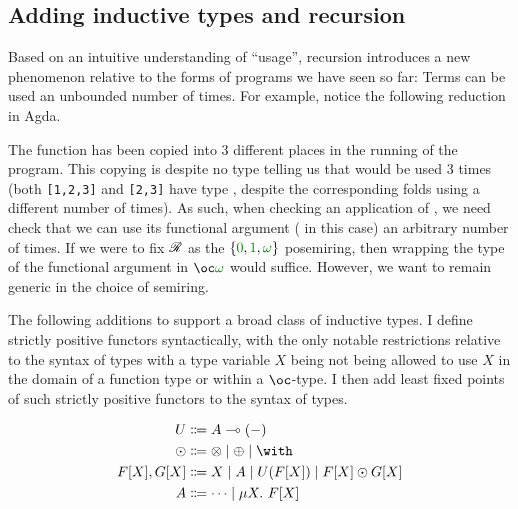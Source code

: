 \begin{mathpar}
\end{mathpar}

\subsection{Adding inductive types and recursion}\label{sec:rec}

Based on an intuitive understanding of ``usage'', recursion introduces a new
phenomenon relative to the forms of programs we have seen so far:
Terms can be used an unbounded number of times.
For example, notice the following reduction in Agda.


The function \AgdaFunction{\_+\_} has been copied into 3 different places in
the running of the program.
This copying is despite no type telling us that \AgdaFunction{\_+\_} would be
used 3 times (both \verb|[1,2,3]| and \verb|[2,3]| have type
\AgdaSpace{}, despite the
corresponding folds using \AgdaFunction{\_+\_} a different number of times).
As such, when checking an application of , we need check
that we can use its functional argument (\AgdaFunction{\_+\_} in this case) an
arbitrary number of times.
If we were to fix $\Ann$ as the $\{\gr0, \gr1, \gr\omega\}$ posemiring, then
wrapping the type of the functional argument in $\oc\gr\omega$ would suffice.
However, we want to remain generic in the choice of semiring.

The following additions to \name{} support a broad class of
inductive types.
I define strictly positive functors syntactically, with the only notable
restrictions relative to the syntax of types with a type variable $X$
being not being allowed to use $X$ in the domain of a function type or within a
$\oc$-type.
I then add least fixed points of such strictly positive functors to the syntax
of types.

\begin{align*}
  U &\Coloneqq A \multimap (-) \\
  {\odot} &\Coloneqq {\otimes} \mid {\oplus} \mid {\with} \\
  F[X], G[X] &\Coloneqq X \mid A \mid U(F[X]) \mid F[X] \odot G[X] \\
  A &\Coloneqq \cdots \mid \mu X.~F[X]
\end{align*}

